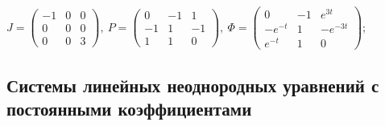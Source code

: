 \begin{enumsolsfull}
		\item \( J = \begin{pmatrix} -1 & 0 & 0 \\ 0 & 0 & 0 \\ 0 & 0 & 3 \end{pmatrix}, ~ P = \begin{pmatrix} 0 & -1 & 1 \\ -1 & 1 & -1 \\ 1 & 1 & 0 \end{pmatrix}, ~ \Phi = \begin{pmatrix} 0 & -1 & e^{3t} \\ -e^{-t} & 1 & -e^{-3t} \\ e^{-t} & 1 & 0 \end{pmatrix} \); %
	
	\end{enumsolsfull}

\subsection*{Системы линейных неоднородных уравнений с постоянными коэффициентами}

